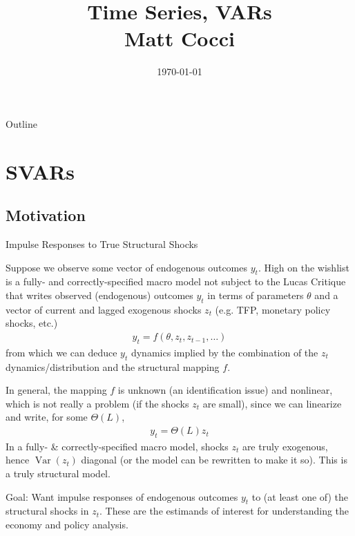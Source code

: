 \documentclass[aspectratio=169, handout]{beamer}
\title[]{Time Series, VARs \\ Matt Cocci}
\author[]{}
\date{\today}
\newcommand{\Var}{\operatorname{Var}}
\begin{document}
\begin{frame}[plain]
\titlepage
\end{frame}


\begin{frame}{Outline}
\tableofcontents
\end{frame}


\section{SVARs}


\subsection{Motivation}

{\scriptsize
\begin{frame}{Impulse Responses to True Structural Shocks}

Suppose we observe some vector of endogenous outcomes $y_t$.
High on the wishlist is a fully- and correctly-specified macro model
not subject to the Lucas Critique that writes observed (endogenous)
outcomes $y_t$ in terms of parameters $\theta$ and a vector of current
and lagged exogenous shocks $z_t$ (e.g. TFP, monetary policy shocks,
etc.)
\begin{align*}
  y_t = f(\theta,z_t,z_{t-1},\ldots)
\end{align*}
from which we can deduce $y_t$ dynamics implied by the combination of
the $z_t$ dynamics/distribution and the structural mapping $f$.

In general, the mapping $f$ is unknown (an \alert{identification} issue)
and nonlinear, which is not really a problem (if the shocks $z_t$ are
small), since we can linearize and write, for some $\Theta(L)$,
\begin{align*}
  y_t=\Theta(L)z_t
\end{align*}
In a fully- \& correctly-specified macro model, shocks $z_t$ are truly
exogenous, hence $\Var(z_t)$ diagonal (or the model can be rewritten to
make it so).
This is a \alert{truly structural model}.

\alert{Goal}:
Want \alert{impulse responses} of endogenous outcomes $y_t$ to
(at least one of) the \alert{structural shocks} in $z_t$.
These are the \alert{estimands} of interest for
understanding the economy and policy analysis.
\end{frame}
}
\end{document}
